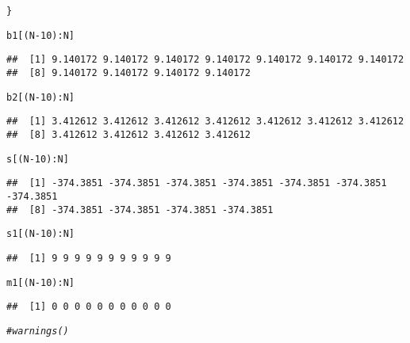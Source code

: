 \documentclass{article}\usepackage[]{graphicx}\usepackage[]{color}
\makeatletter
\newcommand{\hlnum}[1]{\textcolor[rgb]{0.686,0.059,0.569}{#1}}%
\newcommand{\hlcom}[1]{\textcolor[rgb]{0.678,0.584,0.686}{\textit{#1}}}%
\newcommand{\hlopt}[1]{\textcolor[rgb]{0,0,0}{#1}}%
\newcommand{\hlstd}[1]{\textcolor[rgb]{0.345,0.345,0.345}{#1}}%
\newenvironment{kframe}{%
 \def\at@end@of@kframe{}%
 \ifinner\ifhmode%
  \def\at@end@of@kframe{\end{minipage}}%
  \begin{minipage}{\columnwidth}%
 \fi\fi%
 \def\FrameCommand##1{\hskip\@totalleftmargin \hskip-\fboxsep
 \colorbox{shadecolor}{##1}\hskip-\fboxsep
     \hskip-\linewidth \hskip-\@totalleftmargin \hskip\columnwidth}%
 \MakeFramed {\advance\hsize-\width
   \@totalleftmargin\z@ \linewidth\hsize
   \@setminipage}}%
 {\par\unskip\endMakeFramed%
 \at@end@of@kframe}
\newenvironment{knitrout}{}{} %
\makeatother
\begin{document}
\begin{knitrout}
\begin{kframe}
\begin{alltt}
\hlstd{\}}



\hlstd{b1[(N}\hlopt{-}\hlnum{10}\hlstd{)}\hlopt{:}\hlstd{N]}
\end{alltt}
\begin{verbatim}
##  [1] 9.140172 9.140172 9.140172 9.140172 9.140172 9.140172 9.140172
##  [8] 9.140172 9.140172 9.140172 9.140172
\end{verbatim}
\begin{alltt}
\hlstd{b2[(N}\hlopt{-}\hlnum{10}\hlstd{)}\hlopt{:}\hlstd{N]}
\end{alltt}
\begin{verbatim}
##  [1] 3.412612 3.412612 3.412612 3.412612 3.412612 3.412612 3.412612
##  [8] 3.412612 3.412612 3.412612 3.412612
\end{verbatim}
\begin{alltt}
\hlstd{s[(N}\hlopt{-}\hlnum{10}\hlstd{)}\hlopt{:}\hlstd{N]}
\end{alltt}
\begin{verbatim}
##  [1] -374.3851 -374.3851 -374.3851 -374.3851 -374.3851 -374.3851 -374.3851
##  [8] -374.3851 -374.3851 -374.3851 -374.3851
\end{verbatim}
\begin{alltt}
\hlstd{s1[(N}\hlopt{-}\hlnum{10}\hlstd{)}\hlopt{:}\hlstd{N]}
\end{alltt}
\begin{verbatim}
##  [1] 9 9 9 9 9 9 9 9 9 9 9
\end{verbatim}
\begin{alltt}
\hlstd{m1[(N}\hlopt{-}\hlnum{10}\hlstd{)}\hlopt{:}\hlstd{N]}
\end{alltt}
\begin{verbatim}
##  [1] 0 0 0 0 0 0 0 0 0 0 0
\end{verbatim}
\begin{alltt}
\hlcom{#warnings() }
\end{alltt}
\end{kframe}
\end{knitrout}
\end{document}

